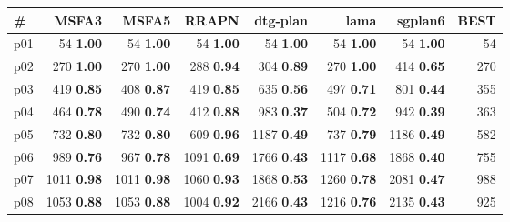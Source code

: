 \begin{tabular}{lrrrrrrr}
\toprule
\textbf{\#} & \textbf{MSFA3} & \textbf{MSFA5} & \textbf{RRAPN} & \textbf{dtg-plan} & \textbf{lama} & \textbf{sgplan6} & \textbf{BEST}\\
\midrule
\multicolumn{1}{l|}{p01} & {\footnotesize 54} \textbf{1.00} & {\footnotesize 54} \textbf{1.00} & {\footnotesize 54} \textbf{1.00} & {\footnotesize 54} \textbf{1.00} & {\footnotesize 54} \textbf{1.00} & {\footnotesize 54} \textbf{1.00} & \multicolumn{1}{|r}{54}\\
\multicolumn{1}{l|}{p02} & {\footnotesize 270} \textbf{1.00} & {\footnotesize 270} \textbf{1.00} & {\footnotesize 288} \textbf{0.94} & {\footnotesize 304} \textbf{0.89} & {\footnotesize 270} \textbf{1.00} & {\footnotesize 414} \textbf{0.65} & \multicolumn{1}{|r}{270}\\
\multicolumn{1}{l|}{p03} & {\footnotesize 419} \textbf{0.85} & {\footnotesize 408} \textbf{0.87} & {\footnotesize 419} \textbf{0.85} & {\footnotesize 635} \textbf{0.56} & {\footnotesize 497} \textbf{0.71} & {\footnotesize 801} \textbf{0.44} & \multicolumn{1}{|r}{355}\\
\multicolumn{1}{l|}{p04} & {\footnotesize 464} \textbf{0.78} & {\footnotesize 490} \textbf{0.74} & {\footnotesize 412} \textbf{0.88} & {\footnotesize 983} \textbf{0.37} & {\footnotesize 504} \textbf{0.72} & {\footnotesize 942} \textbf{0.39} & \multicolumn{1}{|r}{363}\\
\multicolumn{1}{l|}{p05} & {\footnotesize 732} \textbf{0.80} & {\footnotesize 732} \textbf{0.80} & {\footnotesize 609} \textbf{0.96} & {\footnotesize 1187} \textbf{0.49} & {\footnotesize 737} \textbf{0.79} & {\footnotesize 1186} \textbf{0.49} & \multicolumn{1}{|r}{582}\\
\multicolumn{1}{l|}{p06} & {\footnotesize 989} \textbf{0.76} & {\footnotesize 967} \textbf{0.78} & {\footnotesize 1091} \textbf{0.69} & {\footnotesize 1766} \textbf{0.43} & {\footnotesize 1117} \textbf{0.68} & {\footnotesize 1868} \textbf{0.40} & \multicolumn{1}{|r}{755}\\
\multicolumn{1}{l|}{p07} & {\footnotesize 1011} \textbf{0.98} & {\footnotesize 1011} \textbf{0.98} & {\footnotesize 1060} \textbf{0.93} & {\footnotesize 1868} \textbf{0.53} & {\footnotesize 1260} \textbf{0.78} & {\footnotesize 2081} \textbf{0.47} & \multicolumn{1}{|r}{988}\\
\multicolumn{1}{l|}{p08} & {\footnotesize 1053} \textbf{0.88} & {\footnotesize 1053} \textbf{0.88} & {\footnotesize 1004} \textbf{0.92} & {\footnotesize 2166} \textbf{0.43} & {\footnotesize 1216} \textbf{0.76} & {\footnotesize 2135} \textbf{0.43} & \multicolumn{1}{|r}{925}\\

\end{tabular}
